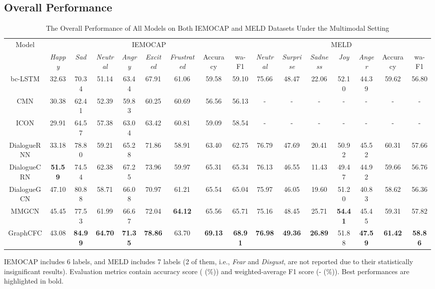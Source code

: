 \documentclass[lettersize,journal]{IEEEtran}
\begin{document}
\subsection{Overall Performance}
\begin{table*}[htbp]
\centering
\renewcommand{\arraystretch}{1.0}
\setlength{\tabcolsep}{3pt}
\caption{The Overall Performance of All Models on Both IEMOCAP and MELD Datasets Under the Multimodal Setting}
\begin{threeparttable}
\begin{tabular}{c|cccccc|cc||ccccc|cc}
\hline
\multicolumn{1}{c|}{\multirow{2}{*}{Model}} & \multicolumn{8}{c||}{IEMOCAP} & \multicolumn{7}{c}{MELD} \\\cline{2-16}          
& \textit{Happy} & \textit{Sad}   & \textit{Neutral} & \textit{Angry} & \textit{Excited} & \textit{Frustrated} & Accuracy & wa-F1 & \textit{Neutral} & \textit{Surprise} & \textit{Sadness} & \textit{Joy} & \textit{Anger} & Accuracy & wa-F1 \\ \hline
bc-LSTM & 32.63 & 70.34 & 51.14 & 63.44 & 67.91 & 61.06 & 59.58 & 59.10  & 75.66 & 48.47 & 22.06 & 52.10  & 44.39 & 59.62 & 56.80 \\
CMN   & 30.38 & 62.41 & 52.39 & 59.83 & 60.25 & 60.69 & 56.56 & 56.13 &  - & - & - & - & - & - & - \\
ICON  & 29.91 & 64.57 & 57.38 & 63.04 & 63.42 & 60.81 & 59.09 & 58.54 &  - & - & - & - & - & - & - \\
DialogueRNN & 33.18 & 78.80  & 59.21 & 65.28 & 71.86 & 58.91 & 63.40  & 62.75 & 76.79 & 47.69 & 20.41 & 50.92 & 45.52 & 60.31 & 57.66 \\
DialogueCRN & \textbf{51.59} & 74.54 & 62.38 & 67.25 & 73.96 & 59.97 & 65.31 & 65.34 & 76.13 & 46.55 & 11.43 & 49.47 & 44.92 & 59.66 & 56.76 \\
DialogueGCN & 47.10  & 80.88 & 58.71 & 66.08 & 70.97 & 61.21 & 65.54 & 65.04 & 75.97 & 46.05 & 19.60  & 51.20  & 40.83 & 58.62 & 56.36 \\
MMGCN & 45.45 & 77.53 & 61.99 & 66.67 & 72.04 & \textbf{64.12} & 65.56 & 65.71 & 75.16 & 48.45 & 25.71 & \textbf{54.41} & 45.45 & 59.31 & 57.82 \\
\hline
GraphCFC  & 43.08 & \textbf{84.99} & \textbf{64.70} & \textbf{71.35}  & \textbf{78.86} & 63.70 & \textbf{69.13} & \textbf{68.91} & \textbf{76.98} & \textbf{49.36} & \textbf{26.89} & 51.88 & \textbf{47.59} & \textbf{61.42} & \textbf{58.86} \\
\hline
\end{tabular}\label{tab:overall7}IEMOCAP includes 6 labels, and MELD includes 7 labels (2 of them, i.e., \textit{Fear} and \textit{Disgust}, are not reported due to their statistically insignificant results). Evaluation metrics contain accuracy score ( (\%)) and weighted-average F1 score (- (\%)). Best performances are highlighted in bold.

\end{threeparttable}
\end{table*}
\end{document}
